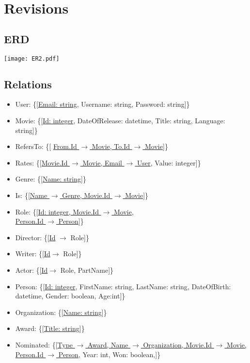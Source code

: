 \section{Revisions}

\subsection{ERD}
\texttt{[image: ER2.pdf]}

\subsection{Relations}
\begin{itemize}
\item User: \{[\underline{Email: string}, Username: string, Password: string]\}

\item Movie: \{[\underline{Id: integer}, DateOfRelease: datetime, Title: string, Language: string]\}

\item RefersTo: \{[ \underline{From.Id $\rightarrow$ Movie, To.Id $\rightarrow$ Movie}]\}

\item Rates: \{[\underline{Movie.Id $\rightarrow$ Movie, Email $ \rightarrow $ User}, Value: integer]\}

\item Genre: \{[\underline{Name: string}]\}

\item Is: \{[\underline{Name $\rightarrow$ Genre, Movie.Id $\rightarrow$ Movie}]\}

\item Role: \{[\underline{Id: integer, Movie.Id $\rightarrow$ Movie},\\ \underline{Person.Id $ \rightarrow $ Person}]\}

\item Director: \{[\underline{Id} $ \rightarrow $ Role]\}

\item Writer: \{[\underline{Id}$ \rightarrow $ Role]\}

\item Actor: \{[\underline{Id}$ \rightarrow $ Role, PartName]\}

\item Person: \{[\underline{Id: integer}, FirstName: string, LastName: string, DateOfBirth: datetime, Gender: boolean, Age:int]\}

\item Organization: \{[\underline{Name: string}]\}

\item Award: \{[\underline{Title: string}]\}

\item Nominated: \{[\underline{Type $ \rightarrow $ Award, Name $ \rightarrow $ Organization, Movie.Id $\rightarrow$ Movie,}\\
\underline{Person.Id $ \rightarrow $ Person}, Year: int, Won: boolean,]\}
\end{itemize}

